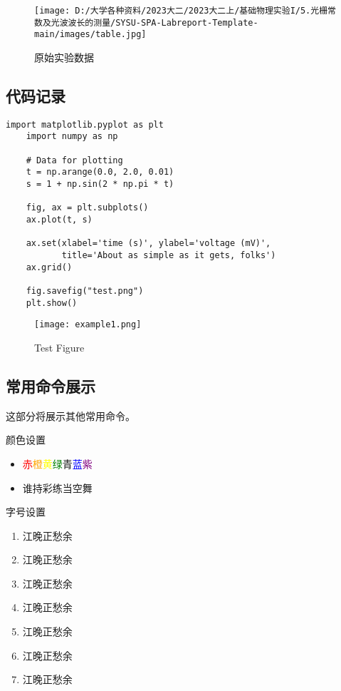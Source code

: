 \documentclass[dvipsnames, svgnames,a4paper,11pt]{article}
\begin{document}
\begin{figure}[H]
	\centering
	\texttt{[image: D:/大学各种资料/2023大二/2023大二上/基础物理实验I/5.光栅常数及光波波长的测量/SYSU-SPA-Labreport-Template-main/images/table.jpg]}
	\caption{原始实验数据}
\end{figure}
	
\clearpage
{}



\clearpage
\appendix
\appendixpage
\addappheadtotoc
\subsection{代码记录}
\begin{lstlisting}[style=pythonstyle,caption=代码记录示例]
	import matplotlib.pyplot as plt
	import numpy as np
	
	# Data for plotting
	t = np.arange(0.0, 2.0, 0.01)
	s = 1 + np.sin(2 * np.pi * t)
	
	fig, ax = plt.subplots()
	ax.plot(t, s)
	
	ax.set(xlabel='time (s)', ylabel='voltage (mV)',
		   title='About as simple as it gets, folks')
	ax.grid()
	
	fig.savefig("test.png")
	plt.show()
\end{lstlisting}
\begin{figure}[H]
    \centering
    \texttt{[image: example1.png]}
    \caption{Test Figure}
\end{figure}

\clearpage
\subsection{常用命令展示}
这部分将展示其他常用命令。

\begin{tbox}{颜色设置}
\begin{itemize}
	\item  \textcolor{Red}{赤}\textcolor{Orange}{橙}\textcolor{Yellow}{黄}\textcolor{Green}{绿}\textcolor{Emerald}{青}\textcolor{Blue}{蓝}\textcolor{Purple}{紫}
	\item  谁持彩练当空舞
\end{itemize}
\end{tbox}

\begin{tbox}{字号设置}
\begin{enumerate}
	\item {\LARGE 江晚正愁余}
	\item {\Large 江晚正愁余}
	\item {\large 江晚正愁余}
	\item {\normalsize 江晚正愁余}
	\item {\small 江晚正愁余}
	\item {\footnotesize 江晚正愁余}
	\item {\scriptsize 江晚正愁余}
\end{enumerate}
\end{tbox}
\end{document}
